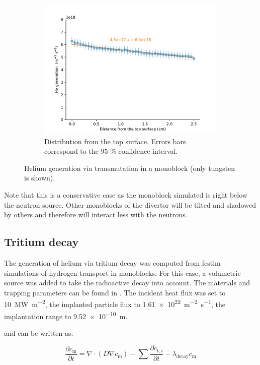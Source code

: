 \begin{figure}
\begin{subfigure}{1\linewidth}
        \includegraphics[width=\linewidth]{Figures/Chapter5/he_generation_distribution.pdf}
        \caption{Distribution from the top surface. Errors bars correspond to the 95 \% confidence interval.}
    \end{subfigure}
    \caption{Helium generation via transmutation in a \gls{monoblock} (only tungsten is shown).}
\end{figure}

Note that this is a conservative case as the \gls{monoblock} simulated is right below the neutron source.
Other \glspl{monoblock} of the \gls{divertor} will be tilted and shadowed by others and therefore will interact less with the neutrons.


\subsection{Tritium decay}

The generation of helium via tritium decay was computed from \gls{festim} simulations of hydrogen transport in \glspl{monoblock}.
For this case, a volumetric source was added to take the radioactive decay into account.
The materials and trapping parameters can be found in .
The incident heat flux was set to \SI{10}{MW.m^{-2}}, the implanted particle flux to \SI{1.61e22}{m^{-2}.s^{-1}}, the implantation range to \SI{9.52e-10}{m}.

 and  can be written as:

\begin{equation}
    \frac{\partial c_\mathrm{m}}{\partial t}=\nabla \cdot (D \nabla c_\mathrm{m} ) -\sum \frac{\partial c_{\mathrm{t}, i}}{\partial t} - \lambda_\mathrm{decay} c_\mathrm{m}
\end{equation}

